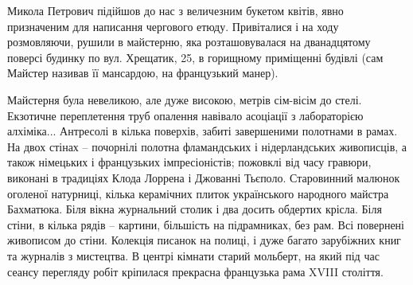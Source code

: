 \begin{multicols}{2} %
\setlength{\parindent}{0pt}








\end{multicols} %

Микола Петрович підійшов до нас з величезним букетом квітів, явно призначеним
для написання чергового етюду. Привіталися і на ходу розмовляючи, рушили в
майстерню, яка розташовувалася на дванадцятому поверсі будинку по вул.
Хрещатик, 25, в горищному приміщенні будівлі (сам Майстер називав її мансардою,
на французький манер).


Майстерня була невеликою, але дуже високою, метрів сім-вісім до стелі.
Екзотичне переплетення труб опалення навівало асоціації з лабораторією
алхіміка... Антресолі в кілька поверхів, забиті завершеними полотнами в рамах.
На двох стінах – почорнілі полотна фламандських і нідерландських живописців, а
також німецьких і французьких імпресіоністів; пожовклі від часу гравюри,
виконані в традиціях Клода Лоррена і Джованні Тьєполо. Старовинний малюнок
оголеної натурниці, кілька керамічних плиток українського народного майстра
Бахматюка. Біля вікна журнальний столик і два досить обдертих крісла. Біля
стіни, в кілька рядів – картини, більшість на підрамниках, без рам. Всі
повернені живописом до стіни. Колекція писанок на полиці, і дуже багато
зарубіжних книг та журналів з мистецтва. В центрі кімнати старий мольберт, на
який під час сеансу перегляду робіт кріпилася прекрасна французька рама XVIII
століття.

